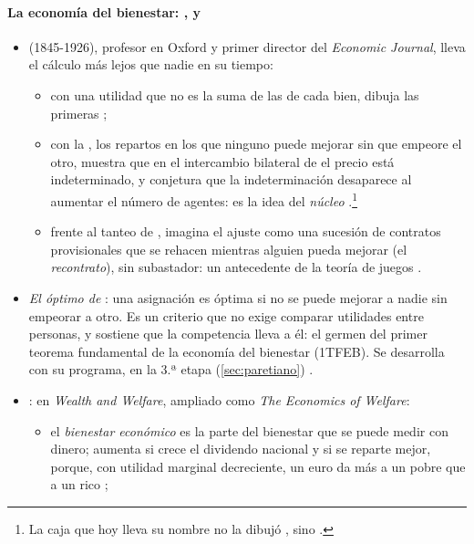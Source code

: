 \documentclass[11pt]{article}
\begin{document}
\paragraph{La economía del bienestar: ,  y }

\begin{itemize}
\item \emph{} (1845-1926), profesor en Oxford y primer director del \emph{Economic Journal}, lleva el cálculo más lejos que nadie en su tiempo\nocite{Edgeworth1881Mathematical}:
  \begin{itemize}
  \item con una utilidad que no es la suma de las de cada bien, dibuja las primeras  ;
  \item con la , los repartos en los que ninguno puede mejorar sin que empeore el otro, muestra que en el intercambio bilateral de  el precio está indeterminado, y conjetura que la indeterminación desaparece al aumentar el número de agentes: es la idea del \emph{núcleo}\nocite{DebreuScarf1963Limit} .\footnote{La caja que hoy lleva su nombre no la dibujó , sino \textcite{Pareto1906Manuale}.}
  \item frente al tanteo de , imagina el ajuste como una sucesión de contratos provisionales que se rehacen mientras alguien pueda mejorar (el \emph{recontrato}), sin subastador: un antecedente de la teoría de juegos .
  \end{itemize}
\item \emph{El óptimo de }: una asignación es óptima si no se puede mejorar a nadie sin empeorar a otro. Es un criterio que no exige comparar utilidades entre personas, y \textcite{Pareto1906Manuale} sostiene que la competencia lleva a él: el germen del primer teorema fundamental de la economía del bienestar (1TFEB). Se desarrolla con su programa, en la 3.ª etapa (\ref{sec:paretiano}) .
\item \emph{}: en \emph{Wealth and Welfare}\nocite{Pigou1912Wealth}, ampliado como \emph{The Economics of Welfare}\nocite{Pigou1920Economics}:
  \begin{itemize}
  \item el \emph{bienestar económico} es la parte del bienestar que se puede medir con dinero; aumenta si crece el dividendo nacional y si se reparte mejor, porque, con utilidad marginal decreciente, un euro da más a un pobre que a un rico ;

\end{itemize}
\end{itemize}
\end{document}
